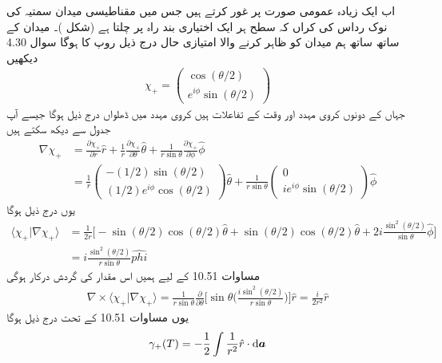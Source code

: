 اب ایک زیادہ عمومی صورت پر غور کرتے ہیں جس میں مقناطیسی میدان سمتیہ کی نوک رداس  کی کراں کہ سطح ہر ایک اختیاری بند راہ پر چلتا ہے  (شکل  )۔ میدان  کے ساتھ ساتھ ہم میدان کو ظاہر کرنے والا امتیازی حال درج ذیل روپ کا ہوگا سوال 4.30 دیکھیں 
\begin{align}
\chi_{+} = 
\begin{pmatrix}
\cos (\theta/2) \\
e^{i \phi} \sin (\theta /2)
\end{pmatrix}
\end{align}
جہاں  کے دونوں کروی مہدد  اور  وقت کے تفاعلات ہیں کروی مہدد میں ڈھلواں درج ذیل ہوگا جیسے آپ جدول سے دیکھ سکتے ہیں 
\begin{align}
\nabla \chi_{+} &= \frac{\partial \chi_{+}}{\partial r} \hat{r} + \frac{1}{r} \frac{\partial \chi_{+}}{\partial \theta} \hat{\theta} + \frac{1}{r \sin \theta} \frac{\partial \chi_{+}}{\partial \phi} \hat{\phi} \\
&= \frac{1}{r} 
\begin{pmatrix}
- (1/2) \sin (\theta/2) \\
(1/2) e^{i \phi} \cos (\theta /2)
\end{pmatrix}
\hat{\theta} + \frac{1}{r \sin \theta}
\begin{pmatrix}
0 \\
i e^{i \phi} \sin (\theta /2)
\end{pmatrix} 
\hat{\phi}
\end{align}
یوں درج ذیل ہوگا 
\begin{align}
\langle \chi_{+} | \nabla \chi_{+} \rangle &= \frac{1}{2r} \big [ - \sin (\theta /2) \cos (\theta /2) \hat{\theta} + \sin (\theta /2) \cos (\theta / 2) \hat{\theta} + 2i \frac{\sin^2 (\theta /2)}{\sin \theta} \hat{\phi} \big ] \\
&= i \frac{\sin^2 (\theta /2)}{r \sin \theta} \hat{phi}
\end{align}
مساوات 10.51 کے لیے ہمیں اس مقدار کی گردش درکار ہوگی 
\begin{align}
\nabla \times \langle \chi_{+} | \nabla \chi_{+} \rangle = \frac{1}{r \sin \theta} \frac{\partial}{\partial \theta} \big [ \sin \theta \big ( \frac{i \sin^2 (\theta /2)}{r \sin \theta} \big ) \big ] \hat{r} = \frac{i}{2r^2} \hat{r}
\end{align}
یوں مساوات 10.51 کے تحت درج ذیل ہوگا 
\begin{align}
\gamma_{+} (T) = - \frac{1}{2} \int \frac{1}{r^2} \hat{r} \cdot \dif \kvec{a}
\end{align}
